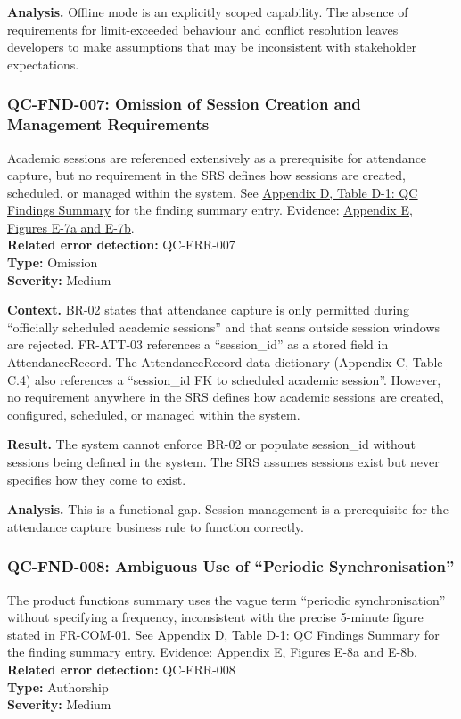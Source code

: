 \documentclass[11pt,a4paper]{article}
\let\orighyperref\hyperref
\renewcommand{\hyperref}[2][]{\orighyperref[#1]{\uline{#2}}}
\begin{document}
\textbf{Analysis.} Offline mode is an explicitly scoped capability. The absence of requirements for limit-exceeded behaviour and conflict resolution leaves developers to make assumptions that may be inconsistent with stakeholder expectations.

\subsubsection*{QC-FND-007: Omission of Session Creation and Management Requirements}
Academic sessions are referenced extensively as a prerequisite for attendance capture, but no requirement in the SRS defines how sessions are created, scheduled, or managed within the system. See \hyperref[tab:qc-findings-summary]{Appendix D, Table D-1: QC Findings Summary} for the finding summary entry. Evidence: \hyperref[fig:evidence-007]{Appendix E, Figures E-7a and E-7b}. \\
\textbf{Related error detection:} QC-ERR-007 \\
\textbf{Type:} Omission \\
\textbf{Severity:} Medium

\textbf{Context.} BR-02 states that attendance capture is only permitted during ``officially scheduled academic sessions'' and that scans outside session windows are rejected. FR-ATT-03 references a ``session\_id'' as a stored field in AttendanceRecord. The AttendanceRecord data dictionary (Appendix C, Table C.4) also references a ``session\_id FK to scheduled academic session''. However, no requirement anywhere in the SRS defines how academic sessions are created, configured, scheduled, or managed within the system.

\textbf{Result.} The system cannot enforce BR-02 or populate session\_id without sessions being defined in the system. The SRS assumes sessions exist but never specifies how they come to exist.

\textbf{Analysis.} This is a functional gap. Session management is a prerequisite for the attendance capture business rule to function correctly.

\subsubsection*{QC-FND-008: Ambiguous Use of ``Periodic Synchronisation''}
The product functions summary uses the vague term ``periodic synchronisation'' without specifying a frequency, inconsistent with the precise 5-minute figure stated in FR-COM-01. See \hyperref[tab:qc-findings-summary]{Appendix D, Table D-1: QC Findings Summary} for the finding summary entry. Evidence: \hyperref[fig:evidence-008]{Appendix E, Figures E-8a and E-8b}. \\
\textbf{Related error detection:} QC-ERR-008 \\
\textbf{Type:} Authorship \\
\textbf{Severity:} Medium
\end{document}
